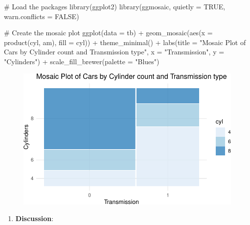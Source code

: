 \documentclass[
  letterpaper,
  DIV=11,
  numbers=noendperiod]{scrreport}
\newenvironment{Shaded}{\begin{snugshade}}{\end{snugshade}}
\newcommand{\AttributeTok}[1]{\textcolor[rgb]{0.40,0.45,0.13}{#1}}
\newcommand{\CommentTok}[1]{\textcolor[rgb]{0.37,0.37,0.37}{#1}}
\newcommand{\ConstantTok}[1]{\textcolor[rgb]{0.56,0.35,0.01}{#1}}
\newcommand{\FunctionTok}[1]{\textcolor[rgb]{0.28,0.35,0.67}{#1}}
\newcommand{\NormalTok}[1]{\textcolor[rgb]{0.00,0.23,0.31}{#1}}
\newcommand{\SpecialCharTok}[1]{\textcolor[rgb]{0.37,0.37,0.37}{#1}}
\newcommand{\StringTok}[1]{\textcolor[rgb]{0.13,0.47,0.30}{#1}}
\providecommand{\tightlist}{%
  \setlength{\itemsep}{0pt}\setlength{\parskip}{0pt}}\usepackage{longtable,booktabs,array}
\begin{document}
\begin{Shaded}
\begin{Highlighting}[]
\CommentTok{\# Load the packages}
\FunctionTok{library}\NormalTok{(ggplot2)}
\FunctionTok{library}\NormalTok{(ggmosaic, }\AttributeTok{quietly =} \ConstantTok{TRUE}\NormalTok{, }\AttributeTok{warn.conflicts =} \ConstantTok{FALSE}\NormalTok{)}

\CommentTok{\# Create the mosaic plot}
\FunctionTok{ggplot}\NormalTok{(}\AttributeTok{data =}\NormalTok{ tb) }\SpecialCharTok{+}
  \FunctionTok{geom\_mosaic}\NormalTok{(}\FunctionTok{aes}\NormalTok{(}\AttributeTok{x =} \FunctionTok{product}\NormalTok{(cyl, am), }\AttributeTok{fill =}\NormalTok{ cyl)) }\SpecialCharTok{+}
  \FunctionTok{theme\_minimal}\NormalTok{() }\SpecialCharTok{+}
  \FunctionTok{labs}\NormalTok{(}\AttributeTok{title =} \StringTok{"Mosaic Plot of Cars by Cylinder count and Transmission type"}\NormalTok{, }
       \AttributeTok{x =} \StringTok{"Transmission"}\NormalTok{, }
       \AttributeTok{y =} \StringTok{"Cylinders"}\NormalTok{) }\SpecialCharTok{+}
  \FunctionTok{scale\_fill\_brewer}\NormalTok{(}\AttributeTok{palette =} \StringTok{"Blues"}\NormalTok{)}
\end{Highlighting}
\end{Shaded}

\begin{figure}[H]

{\centering \includegraphics{08CategoricalData02_files/figure-pdf/unnamed-chunk-28-1.pdf}

}

\end{figure}

\begin{enumerate}
\def\labelenumi{\arabic{enumi}.}
\setcounter{enumi}{10}
\tightlist
\item
  \textbf{Discussion}:
\end{enumerate}
\end{document}
